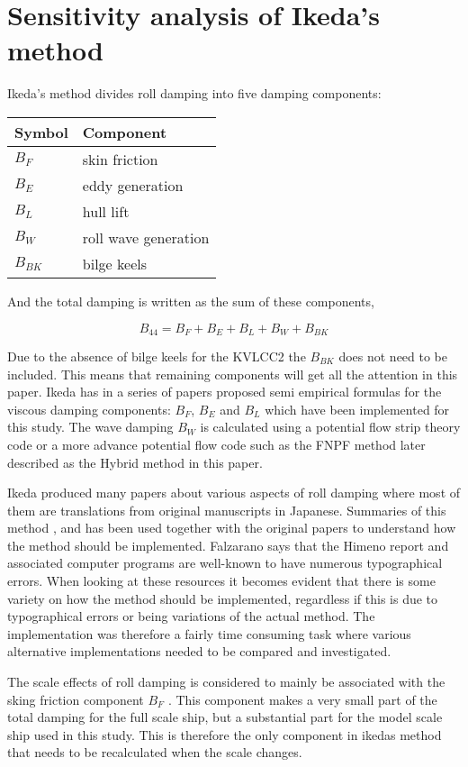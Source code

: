 \section{Sensitivity analysis of Ikeda's
method}\label{sensitivity-analysis-of-ikedas-method}

Ikeda's method divides roll damping into five damping components:

\begin{longtable}[]{@{}ll@{}}
\toprule
Symbol & Component\tabularnewline
\midrule
\endhead
\(B_F\) & skin friction\tabularnewline
\(B_E\) & eddy generation\tabularnewline
\(B_L\) & hull lift\tabularnewline
\(B_W\) & roll wave generation\tabularnewline
\(B_{BK}\) & bilge keels\tabularnewline
\bottomrule
\end{longtable}

And the total damping is written as the sum of these components,

\begin{equation}
B_{44} = B_F + B_E + B_L + B_W + B_{BK}
\end{equation}

Due to the absence of bilge keels for the KVLCC2 the \(B_{BK}\) does not
need to be included. This means that remaining components will get all
the attention in this paper. Ikeda has in a series of papers proposed
semi empirical formulas for the viscous damping components: \(B_F\),
\(B_E\) and \(B_L\) which have been implemented for this study. The wave
damping \(B_W\) is calculated using a potential flow strip theory code
or a more advance potential flow code such as the FNPF method later
described as the Hybrid method in this paper.

Ikeda produced many papers about various aspects of roll damping where
most of them are translations from original manuscripts in Japanese.
Summaries of this method \cite{7505983/FB64RGPF},
\cite{7505983/KAKIM2E2} and \cite{7505983/UGK6YEVD} has been used
together with the original papers to understand how the method should be
implemented. Falzarano says that the Himeno report and associated
computer programs are well-known to have numerous typographical errors.
When looking at these resources it becomes evident that there is some
variety on how the method should be implemented, regardless if this is
due to typographical errors or being variations of the actual method.
The implementation was therefore a fairly time consuming task where
various alternative implementations needed to be compared and
investigated.

The scale effects of roll damping is considered to mainly be associated
with the sking friction component \(B_F\) \cite{7505983/FB64RGPF}. This
component makes a very small part of the total damping for the full
scale ship, but a substantial part for the model scale ship used in this
study. This is therefore the only component in ikedas method that needs
to be recalculated when the scale changes.

